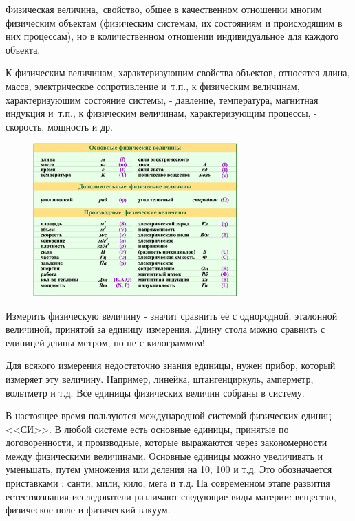 \documentclass[a5paper, 10pt]{diss_4}
\renewcommand{\'}{\,'}
\begin{document}
Физическая величина, свойство, общее в качественном отношении многим физическим
объектам (физическим системам, их состояниям и происходящим в них
процессам), но в количественном отношении индивидуальное для каждого объекта.

 К физическим величинам, характеризующим свойства объектов, относятся длина,
масса, электрическое сопротивление и т.п., к физическим величинам,
характеризующим состояние системы, - давление, температура, магнитная
индукция и т.п., к физическим величинам, характеризующим процессы, -
скорость, мощность и др.

\begin{figure}[h]
\begin{center}
\includegraphics*[width=0.7\textwidth]{img/img01.eps}
\label{fig1}
\end{center}\end{figure}

 Измерить физическую величину - значит сравнить её с однородной, эталонной
величиной, принятой за единицу измерения. Длину стола можно сравнить с
единицей длины метром, но не с килограммом!

 Для всякого измерения недостаточно знания единицы, нужен прибор, который
измеряет эту величину. Например, линейка, штангенциркуль, амперметр,
вольтметр и т.д. Все единицы физических величин собраны в систему.

 В настоящее время пользуются международной системой физических единиц - <<СИ>>.
В любой системе есть основные единицы, принятые по договоренности, и
производные, которые выражаются через закономерности между физическими
величинами. Основные единицы можно увеличивать и уменьшать, путем умножения
или деления на 10, 100 и т.д. Это обозначается приставками : санти, мили,
кило, мега и т.д. На современном этапе развития естествознания исследователи
различают следующие виды материи: вещество, физическое поле и физический
вакуум.
\end{document}
